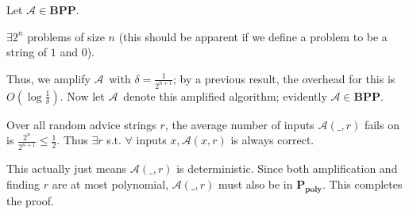 \documentclass[11pt]{article}
\newcommand{\BPP}{\ensuremath{\mathbf{BPP}}}
\newcommand{\Ppoly}{\ensuremath{\mathbf{P_{poly}}}}
\newcommand{\Alg}{\ensuremath{\mathcal{A}}}
\begin{document}
Let $\Alg\in\BPP$.

$\exists 2^n$ problems of size $n$ (this should be apparent if we define a problem to be a string of $1$ and $0$).

Thus, we amplify \Alg\ with $\delta = \frac{1}{2^{n+1}}$; by a previous result, the overhead for this is $O(\log{\frac{1}{\delta}})$. Now let \Alg\ denote this amplified algorithm; evidently $\Alg\in\BPP$.

Over all random advice strings $r$, the average number of inputs $\Alg(\_, r)$ fails on is $\frac{2^n}{2^{n+1}} \leq \frac{1}{2}$. Thus $\exists r$ s.t. $\forall$ inputs $x, \Alg(x, r)$ is always correct.

This actually just means $\Alg(\_, r)$ is deterministic. Since both amplification and finding $r$ are at most polynomial, $\Alg(\_, r)$ must also be in \Ppoly. This completes the proof.




\begin{thebibliography}{42}


\end{thebibliography}
\end{document}
